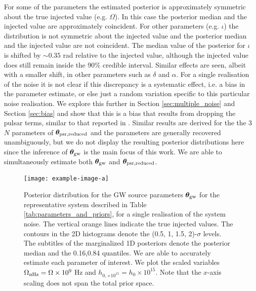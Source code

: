 \documentclass[fleqn,usenatbib,useAMS]{mnras}
\begin{document}
 
 For some of the parameters the estimated posterior is approximately symmetric about the true injected value (e.g. $\Omega$). In this case the posterior median and the injected value are approximately coincident. For other parameters (e.g. $\iota$) the distribution is not symmetric about the injected value and the posterior median and the injected value are not coincident. The median value of the posterior for $\iota$ is shifted by $\sim 0.35$ rad relative to the injected value, although the injected value does still remain inside the 90\% credible interval. Similar effects are seen, albeit with a smaller shift, in other parameters such as $\delta$ and $\alpha$. For a single realisation of the noise it is not clear if this discrepancy is a systematic effect, i.e. a bias in the parameter estimate, or else just a random variation specific to this particular noise realisation. We explore this further in Section \ref{sec:multiple_noise} and Section \ref{sec:bias} and show that this is a bias that results from dropping the pulsar terms, similar to that reported in \cite{Zhupulsarterms}. Similar results are derived for the the 3$N$ parameters of $\boldsymbol{\theta}_{\rm psr, reduced}$ and the parameters are generally recovered unambiguously, but we do not display the resulting posterior distributions here since the inference of $\boldsymbol{\theta}_{\rm gw}$ is the main focus of this work. We are able to simultaneously estimate both $\boldsymbol{\theta}_{\rm gw}$ and $\boldsymbol{\theta}_{\rm psr, reduced}$. 
 
 
\begin{figure}
	\texttt{[image: example-image-a]}
	\caption{Posterior distribution for the GW source parameters $\boldsymbol{\theta}_{\rm gw}$ for the representative system described in Table \ref{tab:parameters_and_priors}, for a single realisation of the system noise. The vertical orange lines indicate the true injected values. The contours in the 2D histograms denote the (0.5, 1, 1.5, 2)-$\sigma$ levels. The subtitles of the marginalized 1D posteriors denote the posterior median and the 0.16,0.84 quantiles. We are able to accurately estimate each parameter of interest. We plot the scaled variables $\Omega_{\rm nHz} = \Omega \times 10^{9}$ Hz and $h_{0, \times 10^{15}} = h_0 \times 10^{15}$. Note that the $x$-axis scaling does not span the total prior space.}
	\label{fig:corner_plot_1}
\end{figure}

\end{document}
